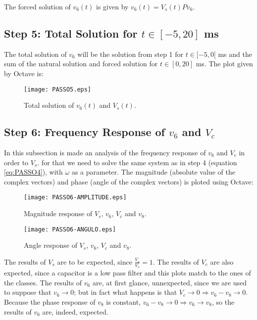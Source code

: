 The forced solution of $v_6(t)$ is given by $v_6(t) = V_s(t)Pv_6$.
\newpage
\subsection{Step 5: Total Solution for $t\in [-5,20]$ ms}

The total solution of $v_6$ will be the solution from step 1 for $t\in [-5,0[$ ms and the sum of the natural solution and forced solution for $t\in [0,20]$ ms.
The plot given by Octave is:

\begin{figure}[h] \centering
\texttt{[image: PASSO5.eps]}
\caption{Total solution of $v_6(t)$ and $V_s(t)$.}
\label{fig:TEO_TOT_SOL}
\end{figure}

\newpage
\subsection{Step 6: Frequency Response of $v_6$ and $V_c$}

In this subsection is made an analysis of the frequency response of $v_6$ and $V_c$ in order to $V_s$. for that we need to solve the same system as in step 4 (equation \ref{eq:PASSO4}), with $\omega$ as a parameter. The magnitude (absolute value of the complex vectors) and phase (angle of the complex vectors) is ploted using Octave:

\begin{figure}[h] \centering
\texttt{[image: PASSO6-AMPLITUDE.eps]}
\caption{Magnitude response of $V_s$, $v_6$, $V_c$ and $v_8$.}
\label{fig:TEO_MAG}
\end{figure}

\begin{figure}[h] \centering
\texttt{[image: PASSO6-ANGULO.eps]}
\caption{Angle response of $V_s$, $v_6$, $V_c$ and $v_8$.}
\label{fig:TEO_ANG}
\end{figure}

The results of $V_s$ are to be expected, since $\frac{V_s}{V_s}=1$.
The results of $V_c$ are also expected, since a capacitor is a low pass filter and this plots match to the ones of the classes.
The results of $v_6$ are, at first glance, unnexpected, since we are used to suppose that $v_6 \to 0$; but in fact what happens is that $V_c \to 0 \Rightarrow v_6 - v_8 \to 0$. Because the phase response of $v_8$ is constant, $v_6 - v_8 \to 0 \Rightarrow v_6 \to v_8$, so the results of $v_6$ are, indeed, expected.




